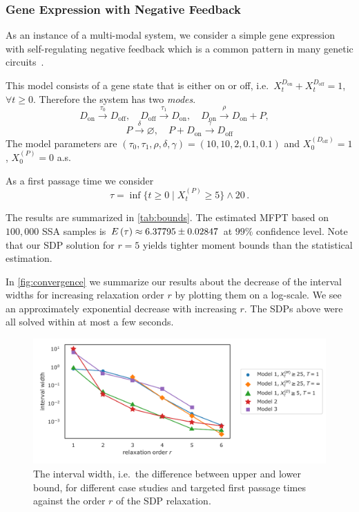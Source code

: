 \subsubsection{Gene Expression with Negative Feedback}
As an instance of a multi-modal system, we consider a simple gene expression with self-regulating
negative feedback which is a common pattern in many genetic circuits~\cite{stekel2008strong}.

\begin{model}\label{model:gexpr}
This model consists of a gene state that is either on or off, i.e.\ $X^{D_{\text{on}}}_t
+X^{D_{\text{off}}}_t = 1$, $\forall t\geq 0$. Therefore the system has two \emph{modes}.
$$
D_{\text{on}} \xrightarrow{\tau_{0}} D_{\text{off}}, \quad
D_{\text{off}} \xrightarrow{\tau_{1}} D_{\text{on}}, \quad
D_{\text{on}} \xrightarrow{\rho} D_{\text{on}} + P, \quad
$$
$$
P\xrightarrow{\delta}\varnothing,\quad
P + D_{\text{on}} \xrightarrow{\gamma} D_{\text{off}}
$$
The model parameters are $(\tau_0,\tau_1,\rho,\delta,\gamma)=(10,10,2,0.1,0.1)$ and
$X_0^{(D_{\text{off}})}=1$, $X_0^{(P)}=0$ a.s.
\end{model}

As a first passage time we consider $$\tau=\inf\{t\geq 0\mid X_t^{(P)} \geq
5\}\land 20\,.$$


The results are summarized in \autoref{tab:bounds}.
The estimated \ac{MFPT} based on $100,\!000$
\ac{SSA} samples is ${E}\left(\tau\right)\approx 6.37795\pm0.02847$ at $99\%$ confidence level.
Note that our \ac{SDP} solution for $r=5$ yields tighter moment bounds than
the statistical estimation.%


In \autoref{fig:convergence} we summarize our results about the decrease of the interval widths for increasing relaxation order $r$ by plotting them on a log-scale.
We see an approximately exponential decrease with increasing $r$.
The \acp{SDP} above were all solved within at most a few seconds.
\begin{figure}[t]
    \centering
    \includegraphics[scale=0.65]{gfx/convergence.pdf}
	\caption[\ac{MFPT} bound convergence]{The interval width, i.e.\ the difference between upper and lower bound,
    for different case studies and targeted first passage times against the order $r$
    of the \ac{SDP} relaxation.\label{fig:convergence}}
\end{figure}



